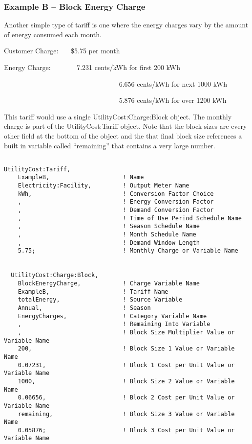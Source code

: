 \subsubsection{Example B -- Block Energy Charge}\label{example-b-block-energy-charge}

Another simple type of tariff is one where the energy charges vary by the amount of energy consumed each month.

Customer Charge:~~~ \$5.75 per month

Energy Charge:~~~~~~~ 7.231 cents/kWh for first 200 kWh

~~~~~~~~~~~~~~~~~~~~~~~~~~~~~~~~~ 6.656 cents/kWh for next 1000 kWh

~~~~~~~~~~~~~~~~~~~~~~~~~~~~~~~~~ 5.876 cents/kWh for over 1200 kWh

This tariff would use a single UtilityCost:Charge:Block object. The monthly charge is part of the UtilityCost:Tariff object. Note that the block sizes are every other field at the bottom of the object and the that final block size references a built in variable called ``remaining'' that contains a very large number.

\begin{lstlisting}

UtilityCost:Tariff,
    ExampleB,                     ! Name
    Electricity:Facility,         ! Output Meter Name
    kWh,                          ! Conversion Factor Choice
    ,                             ! Energy Conversion Factor
    ,                             ! Demand Conversion Factor
    ,                             ! Time of Use Period Schedule Name
    ,                             ! Season Schedule Name
    ,                             ! Month Schedule Name
    ,                             ! Demand Window Length
    5.75;                         ! Monthly Charge or Variable Name


  UtilityCost:Charge:Block,
    BlockEnergyCharge,            ! Charge Variable Name
    ExampleB,                     ! Tariff Name
    totalEnergy,                  ! Source Variable
    Annual,                       ! Season
    EnergyCharges,                ! Category Variable Name
    ,                             ! Remaining Into Variable
    ,                             ! Block Size Multiplier Value or Variable Name
    200,                          ! Block Size 1 Value or Variable Name
    0.07231,                      ! Block 1 Cost per Unit Value or Variable Name
    1000,                         ! Block Size 2 Value or Variable Name
    0.06656,                      ! Block 2 Cost per Unit Value or Variable Name
    remaining,                    ! Block Size 3 Value or Variable Name
    0.05876;                      ! Block 3 Cost per Unit Value or Variable Name
\end{lstlisting}

